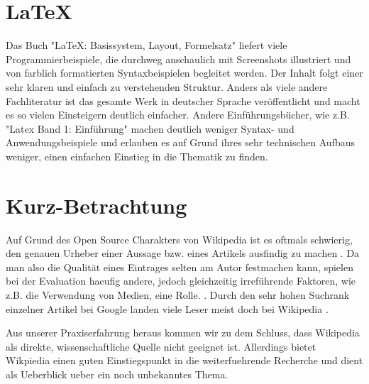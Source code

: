 \documentclass{lib/wa}
\begin{document}
\newpage

\section{LaTeX}

  Das Buch "LaTeX: Basissystem, Layout, Formelsatz" \cite{braune2006} liefert viele Programmierbeispiele, die durchweg anschaulich mit Screenshots illustriert und von farblich formatierten Syntaxbeispielen begleitet werden. Der Inhalt folgt einer sehr klaren und einfach zu verstehenden Struktur. Anders als viele andere Fachliteratur ist das gesamte Werk in deutscher Sprache veröffentlicht und macht es so vielen Einsteigern deutlich einfacher. Andere Einführungsbücher, wie z.B. "Latex Band 1: Einführung" machen deutlich weniger Syntax- und Anwendungsbeispiele und erlauben es auf Grund ihres sehr technischen Aufbaus weniger, einen einfachen Einstieg in die Thematik zu finden.
  \newline


\section{Kurz-Betrachtung}

  Auf Grund des Open Source Charakters von Wikipedia ist es oftmals schwierig, den genauen Urheber einer Aussage bzw. eines Artikels ausfindig zu machen \cite{waters2007}.
  Da man also die Qualität eines Eintrages selten am Autor festmachen kann, spielen bei der Evaluation haeufig andere, jedoch gleichzeitig irreführende Faktoren, wie z.B. die Verwendung von Medien, eine Rolle. \cite{lucassen2010}.
  Durch den sehr hohen Suchrank einzelner Artikel bei Google landen viele Leser meist doch bei Wikipedia \cite{waters2007}.

  Aus unserer Praxiserfahrung heraus kommen wir zu dem Schluss, dass Wikipedia als direkte, wissenschaftliche Quelle nicht geeignet ist. Allerdings bietet Wikpiedia einen guten Einstiegspunkt in die weiterfuehrende Recherche und dient als Ueberblick ueber ein noch unbekanntes Thema.
  \newline

\end{document}
